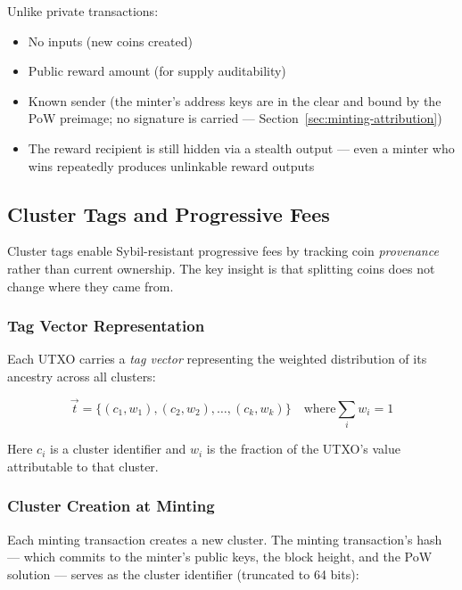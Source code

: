 Unlike private transactions:
\begin{itemize}
  \item No inputs (new coins created)
  \item Public reward amount (for supply auditability)
  \item Known sender (the minter's address keys are in the clear and
    bound by the PoW preimage; no signature is carried ---
    Section~\ref{sec:minting-attribution})
  \item The reward recipient is still hidden via a stealth output ---
    even a minter who wins repeatedly produces unlinkable reward outputs
\end{itemize}

\subsection{Cluster Tags and Progressive Fees}
\label{sec:cluster-tags}

Cluster tags enable Sybil-resistant progressive fees by tracking coin
\textit{provenance} rather than current ownership. The key insight is that
splitting coins does not change where they came from.



\subsubsection{Tag Vector Representation}

Each UTXO carries a \textit{tag vector} representing the weighted distribution
of its ancestry across all clusters:

\begin{equation}
\vec{t} = \{(c_1, w_1), (c_2, w_2), \ldots, (c_k, w_k)\} \quad \text{where} \sum_i w_i = 1
\end{equation}

Here $c_i$ is a cluster identifier and $w_i$ is the fraction of the UTXO's
value attributable to that cluster.

\subsubsection{Cluster Creation at Minting}

Each minting transaction creates a new cluster. The minting
transaction's hash --- which commits to the minter's public keys, the
block height, and the PoW solution --- serves as the cluster
identifier (truncated to 64 bits):


